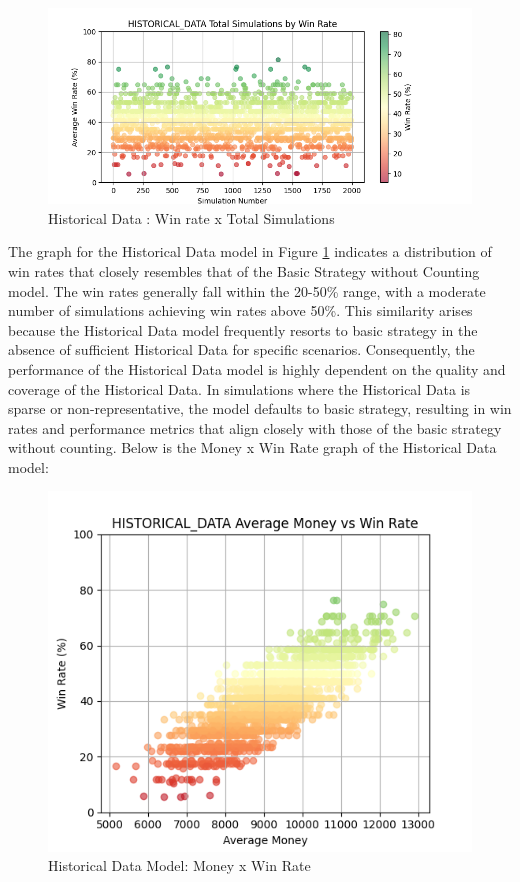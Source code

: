 \documentclass[a4paper,12pt]{report}
\begin{document}
\begin{figure}[h]
\begin{center}
\includegraphics[scale=0.6]{figures/graphs/hd_wr_ts.png}
\end{center}
\caption{Historical Data : Win rate x Total Simulations}
\label{fig:hd_wr_ts}
\end{figure}

The graph for the Historical Data model in Figure \ref{fig:hd_wr_ts} indicates a distribution of win rates that closely resembles that of the Basic Strategy without Counting model. The win rates generally fall within the 20-50\% range, with a moderate number of simulations achieving win rates above 50\%. This similarity arises because the Historical Data model frequently resorts to basic strategy in the absence of sufficient Historical Data for specific scenarios. Consequently, the performance of the Historical Data model is highly dependent on the quality and coverage of the Historical Data. In simulations where the Historical Data is sparse or non-representative, the model defaults to basic strategy, resulting in win rates and performance metrics that align closely with those of the basic strategy without counting. Below is the Money x Win Rate graph of the Historical Data model:

\begin{figure}[h]
\begin{center}
\includegraphics[scale=0.55]{figures/graphs/hd_wr.png}
\end{center}
\caption{Historical Data Model: Money x Win Rate}
\label{fig:hd_wr}
\end{figure}
\end{document}
